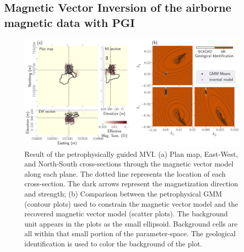 \documentclass[paper, twocolumn]{geophysics} %
\begin{document}

\subsection{Magnetic Vector Inversion of the airborne magnetic data with PGI}



\begin{figure}%
\centering
\includegraphics[width=\textwidth]{Figures/300dpi/Figure10.png}
\caption{Result of the petrophysically guided MVI. (a) Plan map, East-West, and North-South cross-sections through the magnetic vector model along each plane. The dotted line represents the location of each cross-section. The dark arrows represent the magnetization direction and strength; (b) Comparison between the petrophysical GMM (contour plots) used to constrain the magnetic vector model and the recovered magnetic vector model (scatter plots). The background unit appears in the plots as the small ellipsoid. Background cells are all within that small portion of the parameter-space. The geological identification is used to color the background of the plot.}
\label{fig:Figure10.png}
\end{figure}%
\end{document}
